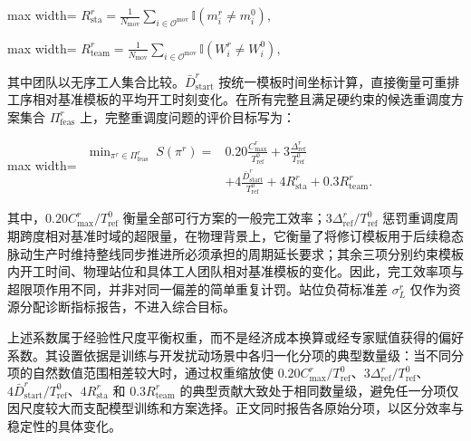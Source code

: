 \documentclass[journal,10pt]{IEEEtran}
\begin{document}
\begin{center}
\begin{adjustbox}{max width=\columnwidth}
$\displaystyle
R_{\mathrm{sta}}^r=
\frac{1}{N_{\mathrm{mov}}}
\sum_{i\in\mathcal{O}^{\mathrm{mov}}}
\mathbb{I}(m_i^r\ne m_i^0),
$
\end{adjustbox}
\end{center}

\begin{center}
\begin{adjustbox}{max width=\columnwidth}
$\displaystyle
R_{\mathrm{team}}^r=
\frac{1}{N_{\mathrm{mov}}}
\sum_{i\in\mathcal{O}^{\mathrm{mov}}}
\mathbb{I}(W_i^r\ne W_i^0),
$
\end{adjustbox}
\end{center}

其中团队以无序工人集合比较。\(\bar D_{\mathrm{start}}^r\) 按统一模板时间坐标计算，直接衡量可重排工序相对基准模板的平均开工时刻变化。在所有完整且满足硬约束的候选重调度方案集合 \(\Pi_{\mathrm{feas}}^r\) 上，完整重调度问题的评价目标写为：

\begin{center}
\begin{adjustbox}{max width=\columnwidth}
$\displaystyle
\begin{aligned}
\min_{\pi^r\in\Pi_{\mathrm{feas}}^r}\;S(\pi^r)={}&
0.20\frac{C_{\max}^{r}}{T_{\mathrm{ref}}^0}
+3\frac{\Delta_{\mathrm{ref}}^r}{T_{\mathrm{ref}}^0}\\
&+4\frac{\bar D_{\mathrm{start}}^r}{T_{\mathrm{ref}}^0}
+4R_{\mathrm{sta}}^r
+0.3R_{\mathrm{team}}^r.
\end{aligned}
$
\end{adjustbox}
\end{center}

其中，\(0.20C_{\max}^{r}/T_{\mathrm{ref}}^0\) 衡量全部可行方案的一般完工效率；\(3\Delta_{\mathrm{ref}}^r/T_{\mathrm{ref}}^0\) 惩罚重调度周期跨度相对基准时域的超限量，在物理背景上，它衡量了将修订模板用于后续稳态脉动生产时维持整线同步推进所必须承担的周期延长要求；其余三项分别约束模板内开工时间、物理站位和具体工人团队相对基准模板的变化。因此，完工效率项与超限项作用不同，并非对同一偏差的简单重复计罚。站位负荷标准差 \(\sigma_L^r\) 仅作为资源分配诊断指标报告，不进入综合目标。

上述系数属于经验性尺度平衡权重，而不是经济成本换算或经专家赋值获得的偏好系数。其设置依据是训练与开发扰动场景中各归一化分项的典型数量级：当不同分项的自然数值范围相差较大时，通过权重缩放使 \(0.20C_{\max}^{r}/T_{\mathrm{ref}}^0\)、\(3\Delta_{\mathrm{ref}}^r/T_{\mathrm{ref}}^0\)、\(4\bar D_{\mathrm{start}}^r/T_{\mathrm{ref}}^0\)、\(4R_{\mathrm{sta}}^r\) 和 \(0.3R_{\mathrm{team}}^r\) 的典型贡献大致处于相同数量级，避免任一分项仅因尺度较大而支配模型训练和方案选择。正文同时报告各原始分项，以区分效率与稳定性的具体变化。
\end{document}
